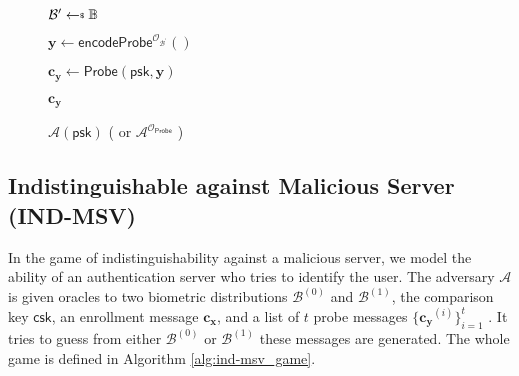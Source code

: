 


	

\begin{figure}[h]
\centering
	\begin{minipage}[t]{0.6\linewidth}
	\centering
	\begin{algorithm}[H]
	\caption{$\mathcal{A}(\textsf{psk})$ ( or $\mathcal{A}^{\mathcal{O}_\textsf{Probe}}$ ) }
	\label{alg:adv:FP}
	\begin{algorithmic}[1]
		\State $\mathcal{B}^\prime \getsdollar \mathbb{B}$
		
		\State $\mathbf{y} \gets \textsf{encodeProbe}^{\mathcal{O}_{\mathcal{B}^\prime }}()$

		\State $\mathbf{c_y} \gets \textsf{Probe}(\textsf{psk}, \mathbf{y})$ 

		\State \Return $\mathbf{c_y}$
	\end{algorithmic}
	\end{algorithm}
	\end{minipage}
	
\end{figure}







\subsection{Indistinguishable against Malicious Server (IND-MSV)}
\label{sec:ind-msv_game}

In the game of indistinguishability against a malicious server, we model the ability of an authentication server who tries to identify the user. The adversary $\mathcal{A}$ is given oracles to two biometric distributions $\mathcal{B}^{(0)}$ and $ \mathcal{B}^{(1)}$, the comparison key $\textsf{csk}$, an enrollment message $\mathbf{c_x}$, and a list of $t$ probe messages $\{ \mathbf{c_y}^{(i)} \}_{i=1}^t$ . It tries to guess from either $\mathcal{B}^{(0)}$ or $ \mathcal{B}^{(1)}$ these messages are generated. The whole game is defined in Algorithm \ref{alg:ind-msv_game}.

